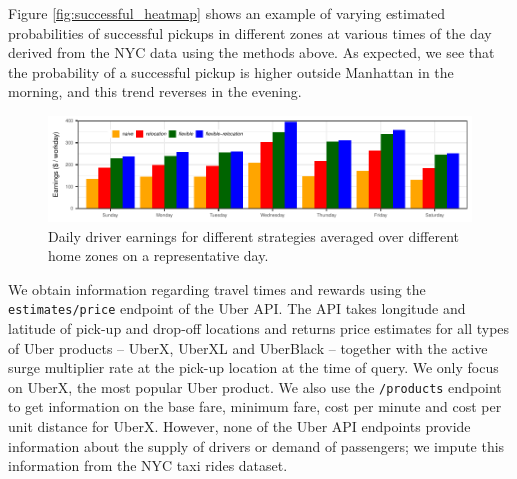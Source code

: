 Figure \ref{fig:successful_heatmap} shows an example of varying estimated probabilities of successful pickups 
  in different zones at various times of the day derived from the NYC data using the methods above. 
As expected, we see that the probability of a successful pickup is higher outside Manhattan in the morning, 
  and this trend reverses in the evening.

\begin{figure}
	\centering
	\includegraphics{figures/daily_earnings_avg.pdf}
	\caption{Daily driver earnings for different strategies averaged over different home zones on a representative day.}
	\label{fig:daily_earnings}
\end{figure}

 We obtain information regarding travel times and rewards using the \texttt{estimates/price} endpoint of the Uber API.
The API takes longitude and latitude of pick-up and drop-off locations and returns price estimates for all types of Uber products -- UberX, UberXL and UberBlack --  together with the active surge multiplier rate at the pick-up location at the time of query.  We only focus on UberX, the most popular Uber product. We also use the \texttt{/products} endpoint to get information on the base fare, minimum fare, cost per minute and cost per unit distance for UberX. However, none of the Uber API endpoints provide information about the supply of  drivers or demand of passengers; we impute this 
information from the NYC taxi rides dataset.

